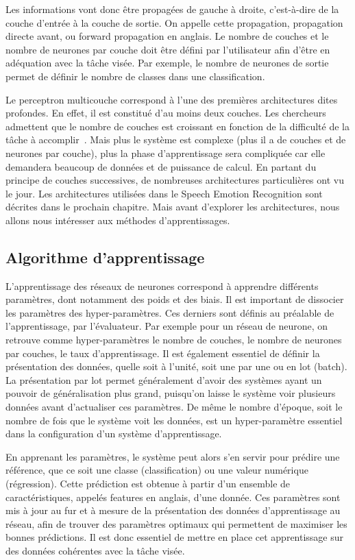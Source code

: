 Les informations vont donc être propagées de gauche à droite, c'est-à-dire de la couche d'entrée à la couche de sortie. On appelle cette propagation, propagation directe avant, ou forward propagation en anglais. Le nombre de couches et le nombre de neurones par couche doit être défini par l'utilisateur afin d'être en adéquation avec la tâche visée. Par exemple, le nombre de neurones de sortie permet de définir le nombre de classes dans une classification.

Le perceptron multicouche correspond à l'une des premières architectures dites profondes. En effet, il est constitué d'au moins deux couches. Les chercheurs admettent que le nombre de couches est croissant en fonction de la difficulté de la tâche à accomplir~\cite{Goodfellow2016}. Mais plus le système est complexe (plus il a de couches et de neurones par couche), plus la phase d'apprentissage sera compliquée car elle demandera beaucoup de données et de puissance de calcul.
En partant du principe de couches successives, de nombreuses architectures particulières ont vu le jour. Les architectures utilisées dans le Speech Emotion Recognition sont décrites dans le prochain chapitre. Mais avant d'explorer les architectures, nous allons nous intéresser aux méthodes d'apprentissages.

\subsection{Algorithme d'apprentissage}
L'apprentissage des réseaux de neurones correspond à apprendre différents paramètres, dont notamment des poids et des biais. Il est important de dissocier les paramètres des hyper-paramètres. Ces derniers sont définis au préalable de l'apprentissage, par l'évaluateur. Par exemple pour un réseau de neurone, on retrouve comme hyper-paramètres le nombre de couches, le nombre de neurones par couches, le taux d'apprentissage. Il est également essentiel de définir la présentation des données, quelle soit à l'unité, soit une par une ou en lot (batch). La présentation par lot permet généralement d'avoir des systèmes ayant un pouvoir de généralisation plus grand, puisqu'on laisse le système voir plusieurs données avant d'actualiser ces paramètres. De même le nombre d'époque, soit le nombre de fois que le système voit les données, est un hyper-paramètre essentiel dans la configuration d'un système d'apprentissage.

En apprenant les paramètres, le système peut alors s'en servir pour prédire une référence, que ce soit une classe (classification) ou une valeur numérique (régression). Cette prédiction est obtenue à partir d'un ensemble de caractéristiques, appelés features en anglais, d'une donnée. Ces paramètres sont mis à jour au fur et à mesure de la présentation des données d'apprentissage au réseau, afin de trouver des paramètres optimaux qui permettent de maximiser les bonnes prédictions. Il est donc essentiel de mettre en place cet apprentissage sur des données cohérentes avec la tâche visée.

